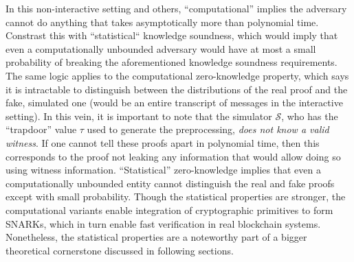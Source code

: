 \noindent In this non-interactive setting and others, ``computational'' implies the adversary cannot do anything that takes asymptotically more than polynomial time. Constrast this with ``statistical`` knowledge soundness, which would imply that even a computationally unbounded adversary would have at most a small probability of breaking the aforementioned knowledge soundness requirements. The same logic applies to the computational zero-knowledge property, which says it is intractable to distinguish between the distributions of the real proof and the fake, simulated one (would be an entire transcript of messages in the interactive setting). In this vein, it is important to note that the simulator $\mathcal{S}$, who has the ``trapdoor'' value $\tau$ used to generate the preprocessing, \textit{does not know a valid witness}. If one cannot tell these proofs apart in polynomial time, then this corresponds to the proof not leaking any information that would allow doing so using witness information. ``Statistical'' zero-knowledge implies that even a computationally unbounded entity cannot distinguish the real and fake proofs except with small probability. Though the statistical properties are stronger, the computational variants enable integration of cryptographic primitives to form SNARKs, which in turn enable fast verification in real blockchain systems. Nonetheless, the statistical properties are a noteworthy part of a bigger theoretical cornerstone discussed in following sections.

